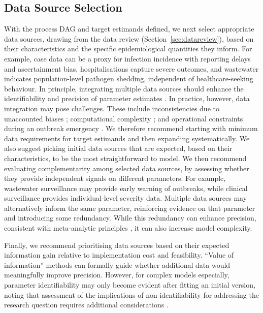 \documentclass{article}
\begin{document}
\subsection{Data Source Selection} \label{sec:data-selection}

With the process \ac{DAG} and target estimands defined, we next select appropriate data sources, drawing from the data review (Section~\ref{sec:datareview}), based on their characteristics and the specific epidemiological quantities they inform.
For example, case data can be a proxy for infection incidence with reporting delays and ascertainment bias, hospitalisations capture severe outcomes, and wastewater indicates population-level pathogen shedding, independent of healthcare-seeking behaviour.
In principle, integrating multiple data sources should enhance the identifiability and precision of parameter estimates \citep{deangelis2018analysing, lison2024generative, russell2024combined, birrell2025real}. In practice, however, data integration may pose challenges. 
These include inconsistencies due to unaccounted biases \citep{presanis2013conflict,knock2021key, Ward2024-sp, corbella2022inferring}; computational complexity \citep{corbella2022inferring}; and operational constraints during an outbreak emergency \citep{mccaw2023role}.
We therefore recommend starting with minimum data requirements for target estimands and then expanding systematically. 
We also suggest picking initial data sources that are expected, based on their characteristics, to be the most straightforward to model.
We then recommend evaluating complementarity among selected data sources, by assessing whether they provide independent signals on different parameters. For example, wastewater surveillance may provide early warning of outbreaks, while clinical surveillance provides individual-level severity data. Multiple data sources may alternatively inform the same parameter, reinforcing evidence on that parameter and introducing some redundancy. While this redundancy can enhance precision, consistent with meta-analytic principles \citep{deangelis2018analysing,borenstein2021introduction}, it can also increase model complexity.

Finally, we recommend prioritising data sources based on their expected information gain relative to implementation cost and feasibility. ``Value of information'' methods \citep{jackson2019value,heath2024value} can formally guide whether additional data would meaningfully improve precision. However, for complex models especially, parameter identifiability may only become evident after fitting an initial version, noting that assessment of the implications of non-identifiability for addressing the research question requires additional considerations \cite{yan2017}.
\end{document}
